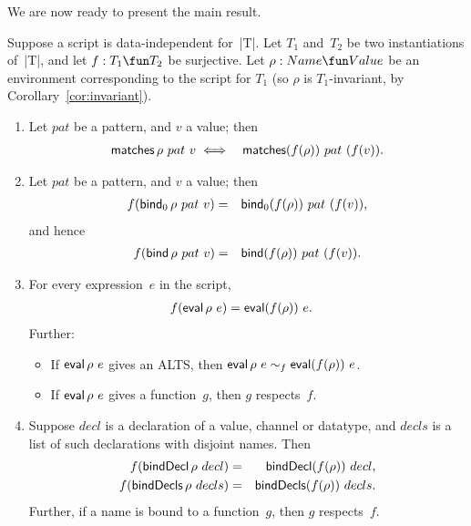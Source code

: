 
We are now ready to present the main result.
%
\begin{prop}
\label{prop:expressions}
Suppose a script is data-independent for~|T|.  Let $T_1$ and~$T_2$ be two
instantiations of~|T|, and let $f : T_1 \fun T_2$ be surjective.  Let $\rho:
Name \fun Value$ be an environment corresponding to the script for $T_1$ (so
$\rho$ is $T_1$-invariant, by Corollary~\ref{cor:invariant}).  
%
\begin{enumerate}
\item\label{item:matches} Let $pat$ be a pattern, and $v$ a value; then
\begin{eqnarray*}
  \mathop{\sf matches} \rho~ pat~v & \iff & \mathop{\sf matches} (f(\rho)) ~ pat~(f(v)).
\end{eqnarray*}

\item\label{item:bind}
Let $pat$ be a pattern, and $v$ a value; then
\begin{eqnarray*}
f  (\mathop{\sf bind}\nolimits_0 \rho~pat~v) &  = & \mathop{\sf bind}\nolimits_0 (f(\rho))~pat~(f(v)),
\end{eqnarray*}
and hence
\begin{eqnarray*}
f  (\mathop{\sf bind}\nolimits \rho~pat~v) & = & \mathop{\sf bind}\nolimits (f(\rho))~pat~(f(v)).
\end{eqnarray*}


\item\label{item:eval} For every expression~$e$ in the script,
\begin{eqnarray*}
f(\mathop{\sf eval} \rho ~ e) & = \mathop{\sf eval} (f(\rho)) ~e .
\end{eqnarray*}
%
Further:
\begin{itemize}
\item If $\mathop{\sf eval} \rho~e$ gives an ALTS, then $\mathop{\sf eval} \rho~e \sim_f \mathop{\sf eval}
  (f(\rho)) ~e$. 

\item If $\mathop{\sf eval} \rho ~ e$ gives a function~$g$, then $g$ respects~$f$. 
\end{itemize}


\item\label{item:bindDecls} Suppose $decl$ is a declaration of a value,
  channel or datatype, and $decls$ is a list of such declarations with
  disjoint names.  Then
  \begin{eqnarray*}
  f (\mathop{\sf bindDecl} \rho~decl) & = & \mathop{\sf bindDecl} (f(\rho))~decl, \\
  f (\mathop{\sf bindDecls} \rho~decls) & = & \mathop{\sf bindDecls} (f(\rho))~decls.
  \end{eqnarray*}
%
Further, if a name is bound to a function~$g$, then $g$ respects~$f$. 


\end{enumerate}
\end{prop}

